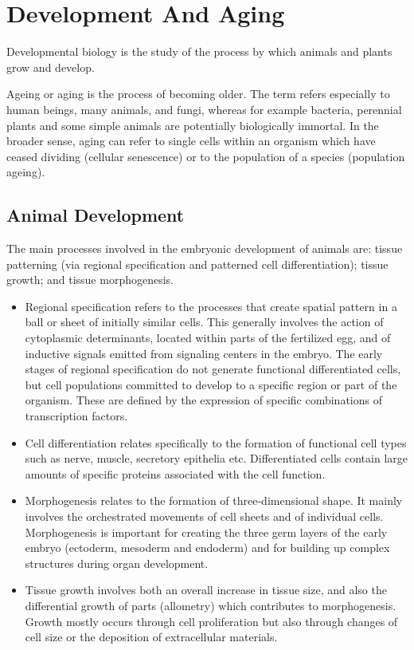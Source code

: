 \hypertarget{development-and-aging}{%
\chapter{Development And Aging}\label{development-and-aging}}

Developmental biology is the study of the process by which animals and plants grow and develop.

Ageing or aging is the process of becoming older. The term refers especially to human beings, many animals, and fungi, whereas for example bacteria, perennial plants and some simple animals are potentially biologically immortal. In the broader sense, aging can refer to single cells within an organism which have ceased dividing (cellular senescence) or to the population of a species (population ageing).

\hypertarget{animal-development}{%
\section{Animal Development}\label{animal-development}}

The main processes involved in the embryonic development of animals are: tissue patterning (via regional specification and patterned cell differentiation); tissue growth; and tissue morphogenesis.

\begin{itemize}
\tightlist
\item
  Regional specification refers to the processes that create spatial pattern in a ball or sheet of initially similar cells. This generally involves the action of cytoplasmic determinants, located within parts of the fertilized egg, and of inductive signals emitted from signaling centers in the embryo. The early stages of regional specification do not generate functional differentiated cells, but cell populations committed to develop to a specific region or part of the organism. These are defined by the expression of specific combinations of transcription factors.
\item
  Cell differentiation relates specifically to the formation of functional cell types such as nerve, muscle, secretory epithelia etc. Differentiated cells contain large amounts of specific proteins associated with the cell function.
\item
  Morphogenesis relates to the formation of three-dimensional shape. It mainly involves the orchestrated movements of cell sheets and of individual cells. Morphogenesis is important for creating the three germ layers of the early embryo (ectoderm, mesoderm and endoderm) and for building up complex structures during organ development.
\item
  Tissue growth involves both an overall increase in tissue size, and also the differential growth of parts (allometry) which contributes to morphogenesis. Growth mostly occurs through cell proliferation but also through changes of cell size or the deposition of extracellular materials.
\end{itemize}



